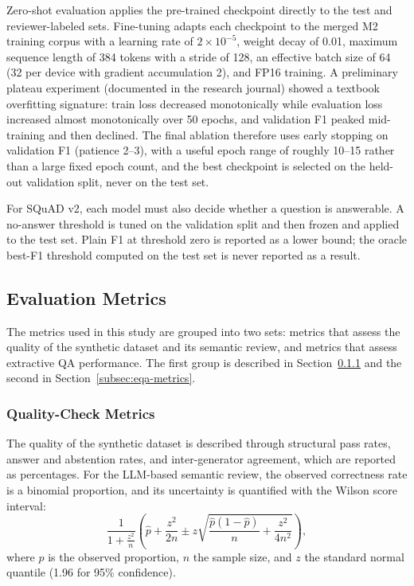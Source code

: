 \documentclass[graybox]{SNmult}
\begin{document}
Zero-shot evaluation applies the pre-trained checkpoint directly to the test
and reviewer-labeled sets. Fine-tuning adapts each checkpoint to the merged M2 training
corpus with a learning rate of \(2 \times 10^{-5}\), weight decay of 0.01,
maximum sequence length of 384 tokens with a stride of 128, an effective batch
size of 64 (32 per device with gradient accumulation 2), and FP16
training. A preliminary plateau experiment (documented in the research
journal) showed a textbook overfitting signature: train loss decreased
monotonically while evaluation loss increased almost monotonically over 50
epochs, and validation F1 peaked mid-training and then declined. The final
ablation therefore uses early stopping on validation F1 (patience 2--3), with
a useful epoch range of roughly 10--15 rather than a large fixed epoch count,
and the best checkpoint is selected on the held-out validation split, never on
the test set.

For SQuAD v2, each model must also decide whether a question is answerable. A
no-answer threshold is tuned on the validation split and then frozen and
applied to the test set. Plain F1 at threshold zero is reported as a lower
bound; the oracle best-F1 threshold computed on the test set is never reported
as a result.

\subsection{Evaluation Metrics}
\label{sec:eval-metrics}

The metrics used in this study are grouped into two sets: metrics that assess
the quality of the synthetic dataset and its semantic review, and metrics that
assess extractive QA performance. The first group is described in
Section~\ref{subsec:quality-metrics} and the second in
Section~\ref{subsec:eqa-metrics}.

\subsubsection{Quality-Check Metrics}
\label{subsec:quality-metrics}

The quality of the synthetic dataset is described through structural pass
rates, answer and abstention rates, and inter-generator agreement, which are
reported as percentages. For the LLM-based semantic review, the observed
correctness rate is a binomial proportion, and its uncertainty is quantified
with the Wilson score interval:
\begin{equation}
\frac{1}{1+\frac{z^2}{n}}\left(\hat{p} + \frac{z^2}{2n} \pm z
\sqrt{\frac{\hat{p}(1-\hat{p})}{n} + \frac{z^2}{4n^2}}\right),
\label{eq:wilson}
\end{equation}
where $\hat{p}$ is the observed proportion, $n$ the sample size, and $z$ the
standard normal quantile (1.96 for 95\% confidence).
\end{document}
